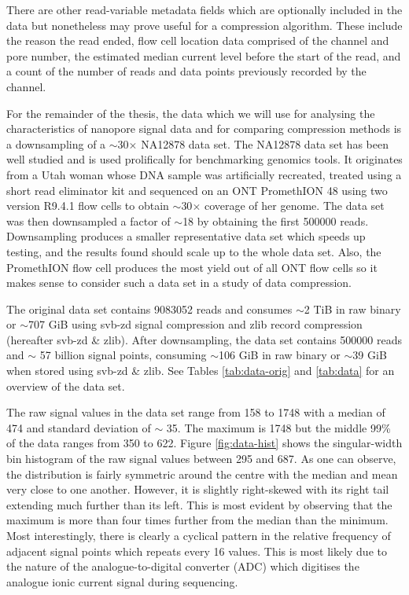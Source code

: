 There are other read-variable metadata fields which are optionally included in the data but nonetheless may prove useful for a compression algorithm. These include the reason the read ended, flow cell location data comprised of the channel and pore number, the estimated median current level before the start of the read, and a count of the number of reads and data points previously recorded by the channel.

For the remainder of the thesis, the data which we will use for analysing the characteristics of nanopore signal data and for comparing compression methods is a downsampling of a $\sim$30$\times$ NA12878 data set. The NA12878 data set has been well studied and is used prolifically for benchmarking genomics tools. It originates from a Utah woman whose DNA sample was artificially recreated, treated using a short read eliminator kit and sequenced on an ONT PromethION 48 using two version R9.4.1 flow cells to obtain $\sim$30$\times$ coverage of her genome.
The data set was then downsampled a factor of $\sim$18 by obtaining the first \num{500000} reads.
Downsampling produces a smaller representative data set which speeds up testing, and the results found should scale up to the whole data set.
Also, the PromethION flow cell produces the most yield out of all ONT flow cells so it makes sense to consider such a data set in a study of data compression.

The original data set contains \num{9083052} reads and consumes $\sim$2 TiB in raw binary or $\sim$707 GiB using svb-zd signal compression and zlib record compression (hereafter svb-zd \& zlib)\cite{slow5}. After downsampling, the data set contains \num{500000} reads and $\sim$ 57 billion signal points, consuming $\sim$106 GiB in raw binary or $\sim$39 GiB when stored using svb-zd \& zlib. See Tables \ref{tab:data-orig} and \ref{tab:data} for an overview of the data set.




The raw signal values in the data set range from 158 to 1748 with a median of 474 and standard deviation of $\sim$ 35. The maximum is 1748 but the middle 99\% of the data ranges from 350 to 622. Figure \ref{fig:data-hist} shows the singular-width bin histogram of the raw signal values between 295 and 687.
As one can observe, the distribution is fairly symmetric around the centre with the median and mean very close to one another. However, it is slightly right-skewed with its right tail extending much further than its left. This is most evident by observing that the maximum is more than four times further from the median than the minimum.
Most interestingly, there is clearly a cyclical pattern in the relative frequency of adjacent signal points which repeats every 16 values.
This is most likely due to the nature of the analogue-to-digital converter (ADC) which digitises the analogue ionic current signal during sequencing.

